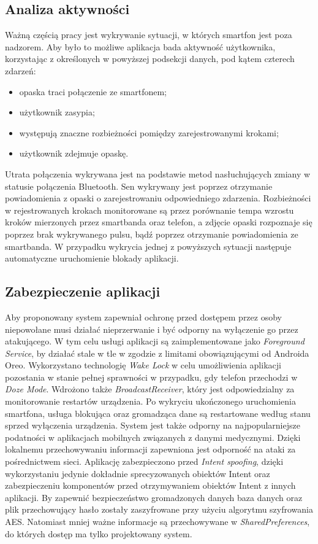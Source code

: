 \subsection{Analiza aktywności}
Ważną częścią pracy jest wykrywanie sytuacji, w których smartfon jest poza nadzorem. Aby było to możliwe
aplikacja bada aktywność użytkownika, korzystając z określonych w powyższej podsekcji danych, pod kątem czterech zdarzeń:
\begin{itemize}
    \item opaska traci połączenie ze smartfonem;
    \item użytkownik zasypia;
    \item występują znaczne rozbieżności pomiędzy zarejestrowanymi krokami;
    \item użytkownik zdejmuje opaskę.
\end{itemize}

\indent Utrata połączenia wykrywana jest na podstawie metod nasłuchujących zmiany w statusie połączenia Bluetooth. Sen wykrywany jest poprzez
otrzymanie powiadomienia z opaski o zarejestrowaniu odpowiedniego zdarzenia. Rozbieżności
w rejestrowanych krokach monitorowane są przez porównanie tempa wzrostu kroków mierzonych przez smartbanda oraz telefon, a zdjęcie opaski rozpoznaje się
poprzez brak wykrywanego pulsu, bądź poprzez otrzymanie powiadomienia ze smartbanda. W przypadku wykrycia jednej z powyższych sytuacji następuje
automatyczne uruchomienie blokady aplikacji.

\subsection{Zabezpieczenie aplikacji}
Aby proponowany system zapewniał ochronę przed dostępem przez osoby niepowołane musi działać nieprzerwanie i być odporny na wyłączenie go przez atakującego. W tym celu usługi aplikacji są zaimplementowane jako \textit{Foreground Service}, by
działać stale w tle w zgodzie z limitami obowiązującymi od Androida Oreo\cite{BGLimitsOreo}. Wykorzystano technologię \textit{Wake Lock}\cite{WakeLock} w celu umożliwienia aplikacji pozostania w stanie pełnej sprawności
w przypadku, gdy telefon przechodzi w \textit{Doze Mode}\cite{DozeMode}. Wdrożono także \textit{BroadcastReceiver}, który jest
odpowiedzialny za monitorowanie restartów urządzenia. Po wykryciu ukończonego uruchomienia smartfona, usługa blokująca oraz gromadząca dane
są restartowane według stanu sprzed wyłączenia urządzenia.
\newline\newline
\indent System jest także odporny na najpopularniejsze podatności w aplikacjach mobilnych związanych z danymi medycznymi\cite{Security-Mobile-Health-Apps}. Dzięki lokalnemu przechowywaniu informacji zapewniona jest odporność na ataki za pośrednictwem sieci. Aplikację zabezpieczono przed \textit{Intent spoofing}, dzięki wykorzystaniu jedynie dokładnie sprecyzowanych obiektów Intent oraz zabezpieczeniu komponentów przed otrzymywaniem obiektów Intent z innych aplikacji. By zapewnić bezpieczeństwo gromadzonych danych baza danych oraz plik przechowujący hasło zostały zaszyfrowane przy użyciu algorytmu szyfrowania AES. Natomiast mniej ważne informacje są przechowywane w \textit{SharedPreferences}, do których dostęp ma tylko projektowany system.
